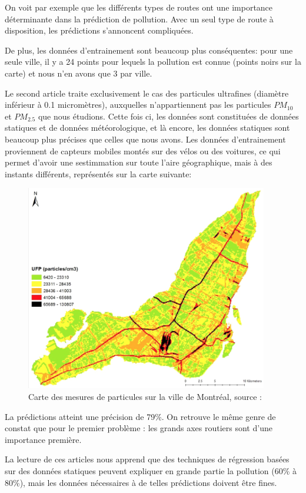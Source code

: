 On voit par exemple que les différents types de routes ont une importance déterminante dans la prédiction de pollution.
Avec un seul type de route à disposition, les prédictions s'annoncent compliquées.

De plus, les données d'entrainement sont beaucoup plus conséquentes: pour une seule ville, il y a 24 points pour lequels la pollution est connue (points noirs sur la carte) et nous n'en avons que 3 par ville.


Le second article \cite{PMreg} traite exclusivement le cas des particules ultrafines (diamètre inférieur à 0.1 micromètres), auxquelles n'appartiennent pas les particules $PM_{10}$ et $PM_{2.5}$ que nous étudions.
Cette fois ci, les données sont constituées de données statiques et de données météorologique, et là encore, les données statiques sont beaucoup plus précises que celles que nous avons.
Les données d'entrainement proviennent de capteurs mobiles montés sur des vélos ou des voitures, ce qui permet d'avoir une sestimmation sur toute l'aire géographique, mais à des instants différents, représentés sur la carte suivante:

\begin{figure}
\begin{center}
  \includegraphics[height=9cm]{./images/pollution_montreal.png}
  \caption{Carte des mesures de particules sur la ville de Montréal, source : \cite{PMreg}}
\end{center}
\end{figure}

La prédictions atteint une précision de 79\%.
On retrouve le même genre de constat que pour le premier problème : les grands axes routiers sont d'une importance première.

La lecture de ces articles nous apprend que des techniques de régression basées sur des données statiques peuvent expliquer en grande partie la pollution (60\% à 80\%), mais les données nécessaires à de telles prédictions doivent être fines.
